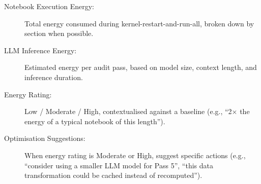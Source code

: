 \documentclass[11pt, a4paper]{article}
\begin{document}
\begin{description}
  \item[Notebook Execution Energy:] Total energy consumed during
    kernel-restart-and-run-all, broken down by section when possible.

  \item[LLM Inference Energy:] Estimated energy per audit pass, based on
    model size, context length, and inference duration.

  \item[Energy Rating:] Low / Moderate / High, contextualised against a
    baseline (e.g., ``2$\times$ the energy of a typical notebook of this
    length'').

  \item[Optimisation Suggestions:] When energy rating is Moderate or High,
    suggest specific actions (e.g., ``consider using a smaller LLM model for
    Pass 5'', ``this data transformation could be cached instead of
    recomputed'').
\end{description}
\end{document}

